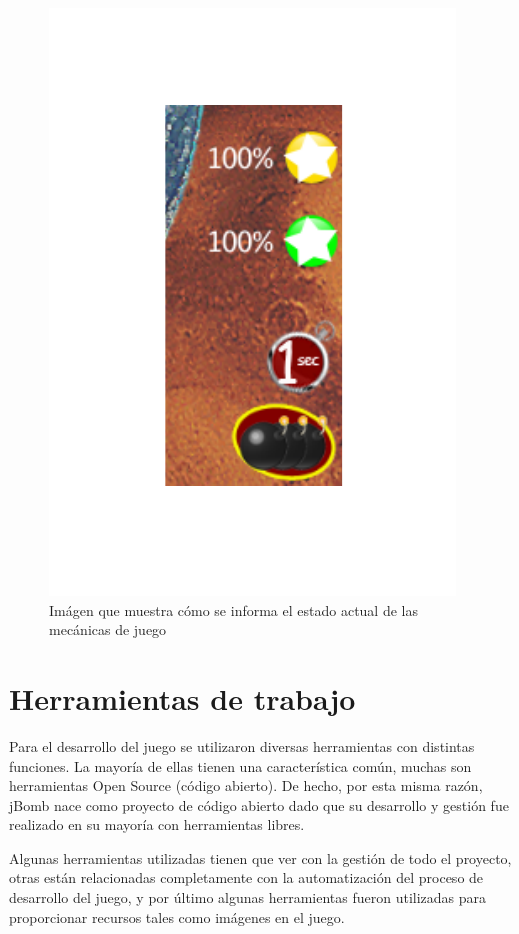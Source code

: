 \documentclass[a4paper,12pt,openany,oneside]{book}
\begin{document}
\begin{figure}
\begin{center}
\includegraphics[scale=.7]{mec.pdf}
\end{center}
\caption[Mecánicas de juego]{Imágen que muestra cómo se informa el estado actual de las mecánicas de juego}
\label{meclabel}
\end{figure}
\chapter{Herramientas de trabajo}
Para el desarrollo del juego se utilizaron diversas herramientas con distintas funciones. La mayoría de ellas tienen una característica común, muchas son herramientas Open Source (código abierto). De hecho, por esta misma razón, jBomb nace como proyecto de código abierto dado que su desarrollo y gestión fue realizado en su mayoría con herramientas libres.

Algunas herramientas utilizadas tienen que ver con la gestión de todo el proyecto, otras están relacionadas completamente con la automatización del proceso de desarrollo del juego, y por último algunas herramientas fueron utilizadas para proporcionar recursos tales como imágenes en el juego.
\end{document}
